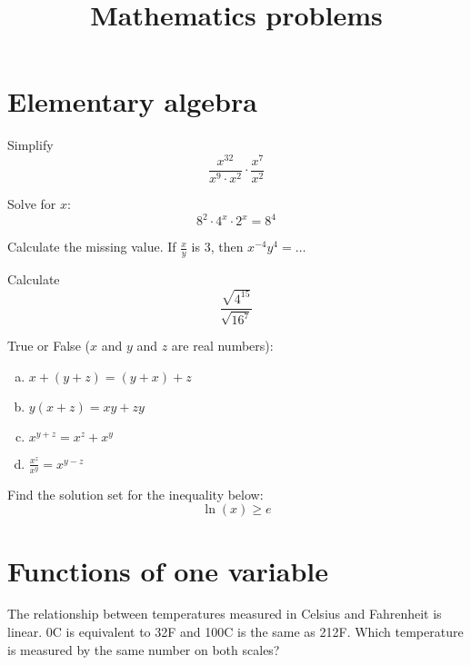 \documentclass[10pt]{article}
\newenvironment{problem}[2][Problem]{\begin{trivlist}
\item[\hskip \labelsep {\bfseries #1}\hskip \labelsep {\bfseries #2.}]}{\end{trivlist}}
\begin{document}
 
\title{Mathematics problems}
\date{}
\maketitle

 \section{Elementary algebra}
 
\begin{problem}{1.1}
Simplify $$\frac{x^{32}}{x^9 \cdot x^2} \cdot \frac{x^7}{x^2}$$
\end{problem}

\begin{problem}{1.2}
Solve for $x$:
$$8^2 \cdot 4^x \cdot 2^x = 8^4$$
\end{problem}

\begin{problem}{1.3}
Calculate the missing value. If $\frac{x}{y}$ is 3, then $x^{-4}y^{4}=\dots$
\end{problem}

\begin{problem}{1.4}
Calculate
$$\frac{\sqrt{4^{15}}}{\sqrt{16^7}}$$
\end{problem}

\begin{problem}{1.5}
True or False ($x$ and $y$ and $z$ are real numbers):
\begin{enumerate}[(a)]
    \item $x+(y+z)=(y+x)+z$
    \item $y(x+z)=xy+zy$
    \item $x^{y+z}=x^z+x^y$
    \item $\frac{x^z}{x^y}=x^{y-z}$
\end{enumerate}
\end{problem}

\begin{problem}{1.6}
Find the solution set for the inequality below:
$$\ln(x) \ge e$$
\end{problem}

\section{Functions of one variable}

\begin{problem}{2.1 (Based on SYD 2.5.6)}
The relationship between temperatures measured in Celsius and Fahrenheit is linear. 0\degree C is equivalent to 32\degree F and 100\degree C is the same as 212\degree F.
 Which temperature is measured by the same number on both scales?
\end{problem}
\end{document}

